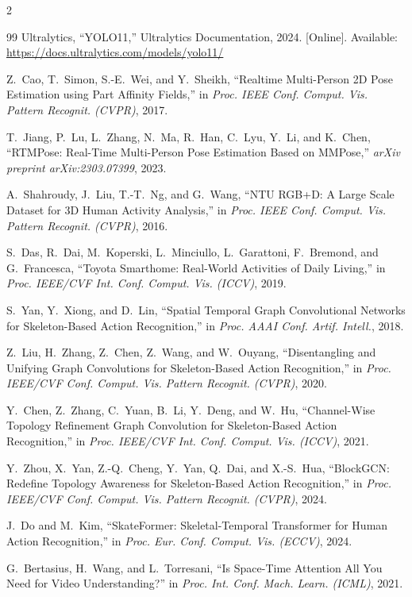 \documentclass[a4paper, twoside, 12pt]{article}
\begin{document}
\begin{multicols}{2}
\begin{thebibliography}{99}
Ultralytics,
``YOLO11,''
Ultralytics Documentation, 2024.
[Online]. Available: \url{https://docs.ultralytics.com/models/yolo11/}

Z.~Cao, T.~Simon, S.-E.~Wei, and Y.~Sheikh,
``Realtime Multi-Person 2D Pose Estimation using Part Affinity Fields,''
in \textit{Proc. IEEE Conf. Comput. Vis. Pattern Recognit. (CVPR)}, 2017.

T.~Jiang, P.~Lu, L.~Zhang, N.~Ma, R.~Han, C.~Lyu, Y.~Li, and K.~Chen,
``RTMPose: Real-Time Multi-Person Pose Estimation Based on MMPose,''
\textit{arXiv preprint arXiv:2303.07399}, 2023.

A.~Shahroudy, J.~Liu, T.-T.~Ng, and G.~Wang,
``NTU RGB+D: A Large Scale Dataset for 3D Human Activity Analysis,''
in \textit{Proc. IEEE Conf. Comput. Vis. Pattern Recognit. (CVPR)}, 2016.

S.~Das, R.~Dai, M.~Koperski, L.~Minciullo, L.~Garattoni, F.~Bremond, and G.~Francesca,
``Toyota Smarthome: Real-World Activities of Daily Living,''
in \textit{Proc. IEEE/CVF Int. Conf. Comput. Vis. (ICCV)}, 2019.

S.~Yan, Y.~Xiong, and D.~Lin,
``Spatial Temporal Graph Convolutional Networks for Skeleton-Based Action Recognition,''
in \textit{Proc. AAAI Conf. Artif. Intell.}, 2018.

Z.~Liu, H.~Zhang, Z.~Chen, Z.~Wang, and W.~Ouyang,
``Disentangling and Unifying Graph Convolutions for Skeleton-Based Action Recognition,''
in \textit{Proc. IEEE/CVF Conf. Comput. Vis. Pattern Recognit. (CVPR)}, 2020.

Y.~Chen, Z.~Zhang, C.~Yuan, B.~Li, Y.~Deng, and W.~Hu,
``Channel-Wise Topology Refinement Graph Convolution for Skeleton-Based Action Recognition,''
in \textit{Proc. IEEE/CVF Int. Conf. Comput. Vis. (ICCV)}, 2021.

Y.~Zhou, X.~Yan, Z.-Q.~Cheng, Y.~Yan, Q.~Dai, and X.-S.~Hua,
``BlockGCN: Redefine Topology Awareness for Skeleton-Based Action Recognition,''
in \textit{Proc. IEEE/CVF Conf. Comput. Vis. Pattern Recognit. (CVPR)}, 2024.

J.~Do and M.~Kim,
``SkateFormer: Skeletal-Temporal Transformer for Human Action Recognition,''
in \textit{Proc. Eur. Conf. Comput. Vis. (ECCV)}, 2024.

G.~Bertasius, H.~Wang, and L.~Torresani,
``Is Space-Time Attention All You Need for Video Understanding?''
in \textit{Proc. Int. Conf. Mach. Learn. (ICML)}, 2021.


\end{thebibliography}
\end{multicols}
\end{document}
